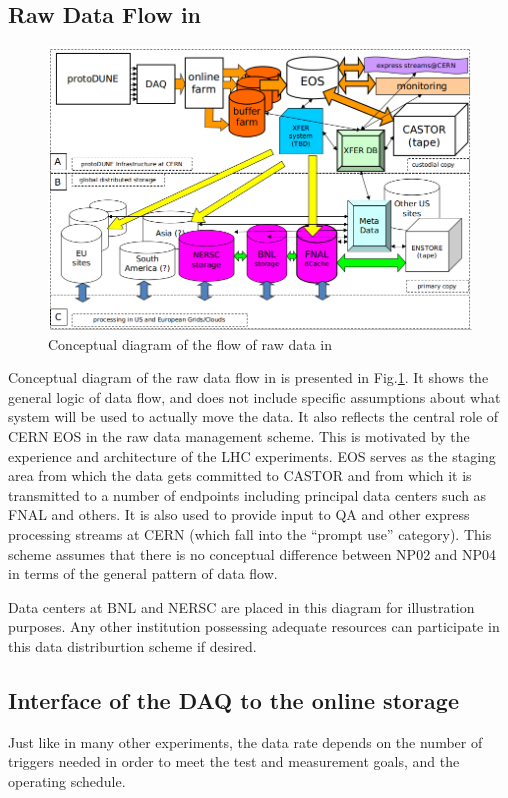 \subsection{Raw Data Flow in \pd}
\label{sec:raw_concept}
\begin{figure}[tbh]
\centering\includegraphics[width=\linewidth]{figures/protoDUNE_raw_data_concept.png}
\caption{\label{fig:raw_concept}Conceptual diagram of the flow of raw data in \pd}
\end{figure}

\noindent
Conceptual diagram of the raw data flow in \pd is presented in Fig.\ref{fig:raw_concept}. It shows the general logic
of data flow, and does not include specific assumptions about what system will be used to actually move the data.
It also reflects the central role of CERN EOS in the \pd raw data management scheme. This is motivated by the experience
and architecture of the LHC experiments. EOS serves as the staging area from which the data gets committed to CASTOR
and from which it is transmitted to a number of endpoints including principal data centers such as FNAL and others.
It is also used to provide input to QA and other express processing streams at CERN (which fall into the ``prompt use'' category).
This scheme assumes that there is no conceptual difference between NP02 and NP04 in terms of the general pattern of data flow.

Data centers at BNL and NERSC are placed in this diagram for illustration purposes. Any other institution possessing adequate
resources can participate in this data distriburtion scheme if desired.

\subsection{Interface of the DAQ to the online storage}
Just like in many other experiments, the \pd data rate depends on the number of
triggers needed in order to meet the test and measurement goals, and
the operating schedule.

